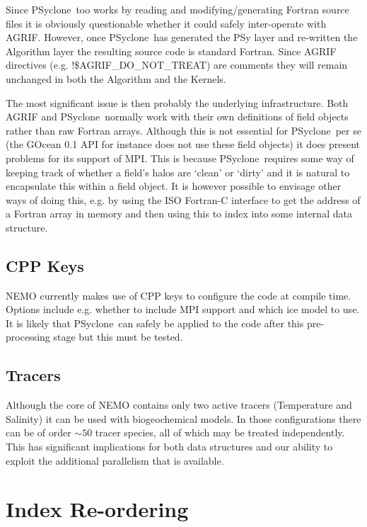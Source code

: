 \documentclass{article}
\newcommand{\psyclone}{{PS}yclone}
\begin{document}
Since \psyclone\ too works by reading and modifying/generating Fortran
source files it is obviously questionable whether it could safely
inter-operate with AGRIF. However, once \psyclone\ has generated the PSy
layer and re-written the Algorithm layer the resulting source code is
standard Fortran. Since AGRIF directives
(e.g. !\$AGRIF\_DO\_NOT\_TREAT) are comments they will remain unchanged
in both the Algorithm and the Kernels.

The most significant issue is then probably the underlying
infrastructure.  Both AGRIF and \psyclone\ normally work with their own
definitions of field objects rather than raw Fortran arrays. Although
this is not essential for \psyclone\ per se (the GOcean 0.1 API for
instance does not use these field objects) it does present problems
for its support of MPI. This is because \psyclone\ requires some way of
keeping track of whether a field's halos are `clean' or `dirty' and it
is natural to encapsulate this within a field object. It is however
possible to envisage other ways of doing this, e.g. by using the ISO
Fortran-C interface to get the address of a Fortran array in memory
and then using this to index into some internal data structure.

\subsection{CPP Keys}

NEMO currently makes use of CPP keys to configure the code at compile
time. Options include e.g. whether to include MPI support and which
ice model to use. It is likely that \psyclone\ can safely be applied to
the code after this pre-processing stage but this must be tested.

\subsection{Tracers}

Although the core of NEMO contains only two active tracers
(Temperature and Salinity) it can be used with biogeochemical
models. In those configurations there can be of order $\sim 50$ tracer
species, all of which may be treated independently. This has
significant implications for both data structures and our ability to
exploit the additional parallelism that is available.

\section{Index Re-ordering}
\end{document}
